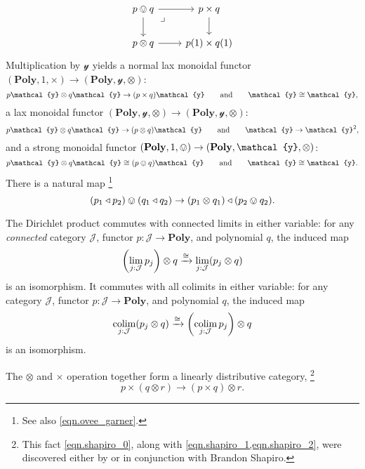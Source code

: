 \documentclass[11pt, one side, article]{memoir}
\theoremstyle{definition}
\theoremstyle{plain}
\DeclareMathOperator*{\colim}{colim}
\newcommand{\cat}[1]{\mathcal{#1}}%
\newcommand{\Cat}[1]{\mathbf{#1}}%
\newcommand{\To}[2][]{\xrightarrow[#1]{\tn{$#2$}}}
\newcommand{\tn}[1]{\textnormal{#1}}
\newcommand{\yon}{{\mathcal{y}}}
\newcommand{\poly}{\Cat{Poly}}
\newcommand{\0}{\textsf{0}}
\newcommand{\1}{\tn{\textsf{1}}}
\newcommand{\tri}{\mathbin{\triangleleft}}
\newcommand{\hh}[2][]{#1 \tn{#2} #1}
\newcommand{\qqand}{\hh[\qquad]{and}}
\begin{document}
\begin{equation}
\begin{tikzcd}
	p\ovee q\ar[r]\ar[d]&
	p\times q\ar[d]\\
	p\otimes q\ar[r]&
	p(1)\times q(1)\ar[ul, phantom, very near end, "\lrcorner"]
\end{tikzcd}
\end{equation}
Multiplication by $\yon$ yields a normal lax monoidal functor $(\poly,1,\times)\to(\poly,\yon,\otimes)$: 
\begin{equation}\label{eqn.lax_times_tensor}
	p\yon\otimes q\yon\to (p\times q)\yon
	\qqand
	\yon\cong \yon,
\end{equation}
a lax monoidal functor $(\poly,\yon,\otimes)\to(\poly,\yon,\otimes)$:
\begin{equation}
	p\yon\otimes q\yon\to (p\otimes q)\yon
	\qqand
	\yon\to\yon^2,
\end{equation}
and a strong monoidal functor $(\poly,1,\ovee)\to(\poly,\yon,\otimes)$:
\begin{equation}
	p\yon\otimes q\yon\cong (p\ovee q)\yon
	\qqand
	\yon\cong \yon.
\end{equation}
There is a natural map%
\footnote{See also \eqref{eqn.ovee_garner}.}
\begin{equation}
(p_1\tri p_2)\ovee (q_1\tri q_2)\to(p_1\otimes q_1)\tri(p_2\ovee q_2).
\end{equation}


The Dirichlet product commutes with connected limits in either variable: for any \emph{connected} category $\cat{J}$, functor $p\colon\cat{J}\to\poly$, and polynomial $q$, the induced map
\begin{equation}\label{eqn.tensor_limits}
	\left(\lim_{j:\cat{J}}p_j\right)\otimes q
	\To{\cong}
	\lim_{j:\cat{J}}(p_j\otimes q)
\end{equation}
is an isomorphism. It commutes with all colimits in either variable: for any category $\cat{J}$, functor $p\colon\cat{J}\to\poly$, and polynomial $q$, the induced map
\begin{equation}
	\colim_{j:\cat{J}}(p_j\otimes q)
	\To{\cong}
	\left(\colim_{j:\cat{J}}p_j\right)\otimes q
\end{equation}
is an isomorphism.

The $\otimes$ and $\times$ operation together form a linearly distributive category,%
\footnote{This fact \eqref{eqn.shapiro_0}, along with \cref{eqn.shapiro_1,eqn.shapiro_2}, were discovered either by or in conjunction with Brandon Shapiro.}
\begin{equation}\label{eqn.shapiro_0}
p\times(q\otimes r)\to (p\times q)\otimes r.
\end{equation}
\end{document}
